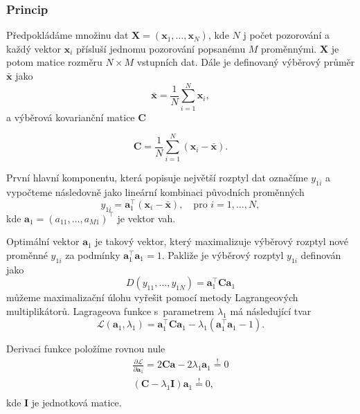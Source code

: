 \subsubsection{Princip}

Předpokládáme množinu dat $\mathbf{X} = (\bm{x}_1, \ldots, \bm{x}_N )$, kde $N$ j počet pozorování a každý vektor $\bm{x}_i$ přísluší jednomu pozorování popsanému $M$ proměnnými. $\mathbf{X}$ je potom matice rozměru $N\times M$ vstupních dat. Dále je definovaný výběrový průměr $\bar{\bm{x}}$ jako
\begin{equation}
    \bar{\bm{x}} = \frac{1}{N} \sum_{i=1}^{N} \bm{x}_i,
\end{equation}
a výběrová kovarianční matice $\mathbf{C}$

\begin{equation}
    \mathbf{\mathbf{C}} = \frac{1}{N} \sum_{i=1}^{N} (\bm{x}_i - \bar{\bm{x}}).
\end{equation}

První hlavní komponentu, která popisuje největší rozptyl dat označíme $y_{1i}$ a vypočteme následovně jako lineární kombinaci původních proměnných
\begin{equation}
    y_{1i} = \bm{a}_1^\top (\bm{x}_i - \bar{\bm{x}}), \quad \mbox{pro } i=1,\ldots,N,
\end{equation}
kde $\bm{a}_1 = (a_{11}, \ldots, a_{M1})^\top $ je vektor vah. 

Optimální vektor $\bm{a}_1$ je takový vektor, který maximalizuje výběrový rozptyl nové proměnné $y_{1i}$ za podmínky $\bm{a}_1^\top\bm{a}_1 = 1$. Pakliže je výběrový rozptyl $y_{1i}$ definován jako 
\begin{equation}
    D(y_{11}, \ldots, y_{1N}) = \bm{a}_1^\top \mathbf{C} \bm{a}_1
\end{equation}
můžeme maximalizační úlohu vyřešit pomocí metody Lagrangeových multiplikátorů. Lagrageova funkce s~parametrem $\lambda_1$ má následující tvar
\begin{equation}
    \mathcal{L}(\bm{a}_1, \lambda_1) = \bm{a}_1^\top \mathbf{C} \bm{a}_1 - \lambda_1(\bm{a}_1^\top\bm{a}_1 - 1).
\end{equation}

Derivaci funkce položíme rovnou nule 
\begin{align*}
    \frac{\partial \mathcal{L}}{\partial \bm{a}_1}  = 2 \mathbf{C} \bm{a} - 2\lambda_1 \bm{a}_1 \overset{!}{=}  0 \\
    (\mathbf{C} - \lambda_1 \mathbf{I} ) \bm{a}_1 \overset{!}{=}  0,  \\
\end{align*}
kde $\mathbf{I}$ je jednotková matice.

